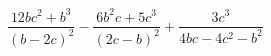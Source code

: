 \begin{ex}[type=expression]
	\begin{condition}
		\(\dfrac{12bc^2+b^3}{(b-2c)^2}-\dfrac{6b^2c+5c^3}{(2c-b)^2}+\dfrac{3c^3}{4bc-4c^2-b^2}\)
	\end{condition}
\end{ex}